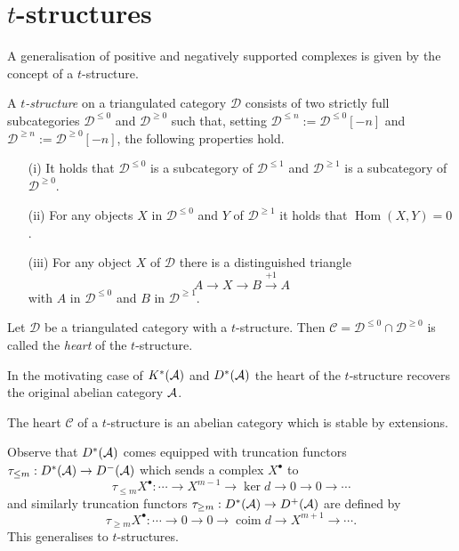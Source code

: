 \section{$t$-structures}
A generalisation of positive and negatively supported complexes is given by the concept of a $t$-structure.
\begin{definition}
 A {\it $t$-structure} on a triangulated category $\mathcal{D}$ consists of two strictly full subcategories $\mathcal{D}^{\leq 0}$ and $\mathcal{D}^{\geq 0}$ such that, setting $\mathcal{D}^{\leq n} := \mathcal{D}^{\leq 0}[-n]$ and $\mathcal{D}^{\geq n} := \mathcal{D}^{\geq 0} [-n]$, the following properties hold.
 \begin{enumerate}
   \item[(i)] It holds that $\mathcal{D}^{\leq 0}$ is a subcategory of $\mathcal{D}^{\leq 1}$ and $\mathcal{D}^{\geq 1}$ is a subcategory of $\mathcal{D}^{\geq 0}$.
   \item[(ii)] For any objects $X$ in $\mathcal{D}^{\leq 0}$ and $Y$ of $\mathcal{D}^{\geq 1}$ it holds that $\operatorname{Hom}(X,Y) = 0$.
   \item[(iii)] For any object $X$ of $\mathcal{D}$ there is a distinguished triangle
   $$A \to X \to B \xrightarrow{+1} A $$
   with $A$ in $\mathcal{D}^{\leq 0}$ and $B$ in $\mathcal{D}^{\geq 1}$.
 \end{enumerate}
\end{definition}
\begin{definition}
 Let $\mathcal{D}$ be a triangulated category with a $t$-structure. Then $\mathcal{C} = \mathcal{D}^{\leq 0} \cap \mathcal{D}^{\geq 0}$ is called the {\it heart} of the $t$-structure.
\end{definition}
In the motivating case of $K^*(\AA)$ and $D^*(\AA)$ the heart of the $t$-structure recovers the original abelian category $\AA$.
\begin{proposition}{\cite[Proposition 5.1.2.]{dimca2004sheaves}}\label{prop: HeartExtension}
 The heart $\mathcal{C}$ of a $t$-structure is an abelian category which is stable by extensions.
\end{proposition}
Observe that $D^*(\AA)$ comes equipped with truncation functors
$\tau_{\leq m}:D^*(\AA)\to D^-(\AA)$ which sends a complex $X^\bullet$ to
$$\tau_{\leq m}X^\bullet : \cdots \to X^{m-1} \to \ker d \to 0 \to 0 \to \cdots$$
and similarly truncation functors $\tau_{\geq m}:D^*(\AA)\to D^{+}(\AA)$ are defined by
$$\tau_{\geq m}X^\bullet: \cdots \to 0 \to 0 \to \operatorname{coim} d \to X^{m+1}\to \cdots.$$
This generalises to $t$-structures.
